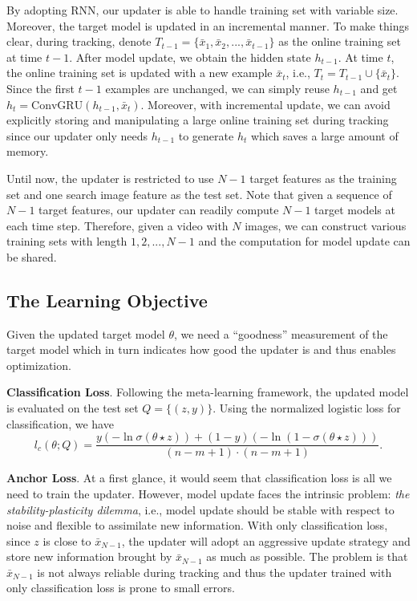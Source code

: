 \documentclass[journal]{IEEEtran}
\begin{document}
By adopting RNN, our updater is able to handle training set with variable size. Moreover, the target model is updated in an incremental manner. To make things clear, during tracking, denote $T_{t-1} = \{\bar{x}_1, \bar{x}_2, ..., \bar{x}_{t-1}\}$ as the online training set at time $t-1$. After model update, we obtain the hidden state $h_{t-1}$. At time $t$, the online training set is updated with a new example $\bar{x}_t$, i.e., $T_t = T_{t-1} \cup \{\bar{x}_t\}$. Since the first $t-1$ examples are unchanged, we can simply reuse $h_{t-1}$ and get $h_t = \text{ConvGRU}(h_{t-1}, \bar{x}_t)$. Moreover, with incremental update, we can avoid explicitly storing and manipulating a large online training set during tracking since our updater only needs $h_{t-1}$ to generate $h_t$ which saves a large amount of memory.

Until now, the updater is restricted to use $N-1$ target features as the training set and one search image feature as the test set. Note that given a sequence of $N - 1$ target features, our updater can readily compute $N - 1$ target models at each time step. Therefore, given a video with $N$ images, we can construct various training sets with length $1, 2, ..., N - 1$ and the computation for model update can be shared.

\subsection{The Learning Objective}
Given the updated target model $\theta$, we need a ``goodness'' measurement of the target model which in turn indicates how good the updater is and thus enables optimization. 

\textbf{Classification Loss}. Following the meta-learning framework, the updated model is evaluated on the test set $Q = \{(z, y)\}$. Using the normalized logistic loss for classification, we have
\begin{equation}
  l_c(\theta; Q) =  \frac{y(-\ln\sigma(\theta \star z)) + (1 - y)(-\ln(1 - \sigma(\theta \star z)))}{(n - m + 1)\cdot (n - m + 1)}. 
\end{equation}

\textbf{Anchor Loss}. At a first glance, it would seem that classification loss is all we need to train the updater. However, model update faces the intrinsic problem: \emph{the stability-plasticity dilemma}, i.e., model update should be stable with respect to noise and flexible to assimilate new information. With only classification loss, since $z$ is close to $\bar{x}_{N-1}$, the updater will adopt an aggressive update strategy and store new information brought by $\bar{x}_{N-1}$ as much as possible. The problem is that $\bar{x}_{N-1}$ is not always reliable during tracking and thus the updater trained with only classification loss is prone to small errors. 
\end{document}
